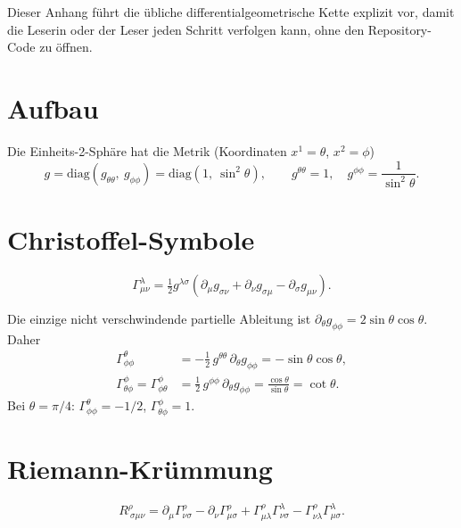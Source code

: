 \documentclass[10pt,twoside,openany]{book}
\begin{document}
Dieser Anhang führt die übliche differentialgeometrische Kette explizit vor, damit die
Leserin oder der Leser jeden Schritt verfolgen kann, ohne den Repository-Code zu öffnen.

\section{Aufbau}

Die Einheits-2-Sphäre hat die Metrik (Koordinaten $x^1=\theta$, $x^2=\phi$)
\begin{equation}
g = \mathrm{diag}\!\left(g_{\theta\theta},\ g_{\phi\phi}\right)
  = \mathrm{diag}\!\left(1,\ \sin^2\theta\right),
\qquad g^{\theta\theta}=1,\quad g^{\phi\phi}=\frac{1}{\sin^2\theta}.
\end{equation}

\section{Christoffel-Symbole}

\begin{equation}
\Gamma^\lambda_{\mu\nu} = \tfrac12 g^{\lambda\sigma}\left(
\partial_\mu g_{\sigma\nu} + \partial_\nu g_{\sigma\mu} - \partial_\sigma g_{\mu\nu}\right).
\end{equation}

Die einzige nicht verschwindende partielle Ableitung ist
$\partial_\theta g_{\phi\phi} = 2\sin\theta\cos\theta$. Daher
\begin{align}
\Gamma^\theta_{\phi\phi} &= -\tfrac12\, g^{\theta\theta}\, \partial_\theta g_{\phi\phi}
= -\sin\theta\cos\theta, \\
\Gamma^\phi_{\theta\phi} = \Gamma^\phi_{\phi\theta}
&= \tfrac12\, g^{\phi\phi}\, \partial_\theta g_{\phi\phi}
= \frac{\cos\theta}{\sin\theta} = \cot\theta.
\end{align}
Bei $\theta=\pi/4$: $\Gamma^\theta_{\phi\phi}=-1/2$, $\Gamma^\phi_{\theta\phi}=1$.

\section{Riemann-Krümmung}

\begin{equation}
R^\rho_{\ \sigma\mu\nu} = \partial_\mu\Gamma^\rho_{\nu\sigma}
- \partial_\nu\Gamma^\rho_{\mu\sigma}
+ \Gamma^\rho_{\mu\lambda}\Gamma^\lambda_{\nu\sigma}
- \Gamma^\rho_{\nu\lambda}\Gamma^\lambda_{\mu\sigma}.
\end{equation}
\end{document}
